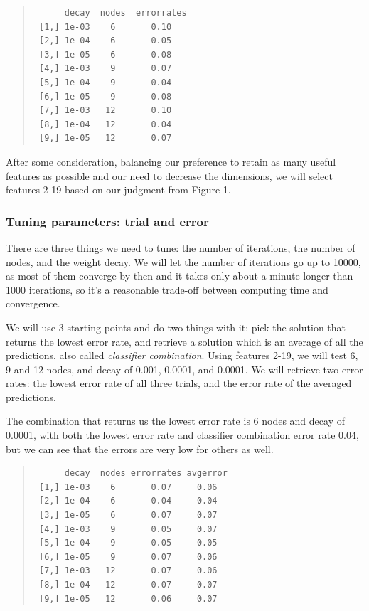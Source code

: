 \documentclass[11pt, a4paper]{article}
\begin{document}
\begin{quote}
\begin{verbatim}
      decay  nodes  errorrates
 [1,] 1e-03    6       0.10
 [2,] 1e-04    6       0.05
 [3,] 1e-05    6       0.08
 [4,] 1e-03    9       0.07
 [5,] 1e-04    9       0.04
 [6,] 1e-05    9       0.08
 [7,] 1e-03   12       0.10
 [8,] 1e-04   12       0.04
 [9,] 1e-05   12       0.07
\end{verbatim}
\end{quote}

After some consideration, balancing our preference to retain as many useful features as possible and our need to decrease the dimensions, we will select features 2-19 based on our judgment from Figure 1.

\subsubsection{Tuning parameters: trial and error}

There are three things we need to tune: the number of iterations, the number of nodes, and the weight decay. We will let the number of iterations go up to 10000, as most of them converge by then and it takes only about a minute longer than 1000 iterations, so it's a reasonable trade-off between computing time and convergence.

We will use 3 starting points and do two things with it: pick the solution that returns the lowest error rate, and retrieve a solution which is an average of all the predictions, also called \emph{classifier combination}. Using features 2-19, we will test 6, 9 and 12 nodes, and decay of 0.001, 0.0001, and 0.0001. We will retrieve two error rates: the lowest error rate of all three trials, and the error rate of the averaged predictions.
 
The combination that returns us the lowest error rate is 6 nodes and decay of 0.0001, with both the lowest error rate and classifier combination error rate 0.04, but we can see that the errors are very low for others as well.

\begin{quote}
\begin{verbatim}
      decay  nodes errorrates avgerror
 [1,] 1e-03    6       0.07     0.06
 [2,] 1e-04    6       0.04     0.04
 [3,] 1e-05    6       0.07     0.07
 [4,] 1e-03    9       0.05     0.07
 [5,] 1e-04    9       0.05     0.05
 [6,] 1e-05    9       0.07     0.06
 [7,] 1e-03   12       0.07     0.06
 [8,] 1e-04   12       0.07     0.07
 [9,] 1e-05   12       0.06     0.07
\end{verbatim}
\end{quote}
\end{document}
